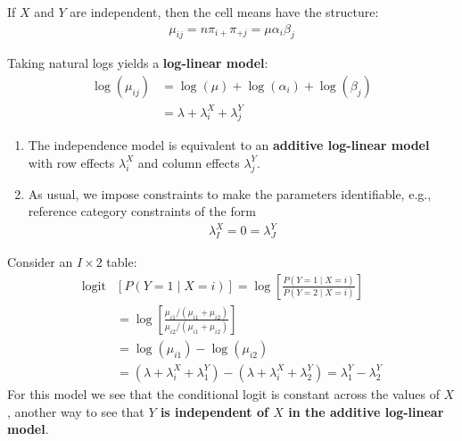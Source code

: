 \documentclass[11pt]{elegantbook}
\begin{document}
If $X$ and $Y$ are \textnormal{independent}, then the cell means have the structure:
\begin{equation}
    \begin{aligned}
        \mu_{ij}=n\pi_{i+}\pi_{+j}=\mu\alpha_i\beta_j
    \end{aligned}
    \nonumber
\end{equation}
\begin{definition}
    Taking natural logs yields a \textbf{log-linear model}:
    \begin{equation}
        \begin{aligned}
            \log(\mu_{ij})&=\log(\mu)+\log(\alpha_i)+\log(\beta_j)\\
            &=\lambda+\lambda_i^X+\lambda_j^Y
        \end{aligned}
        \nonumber
    \end{equation}
    \begin{enumerate}[$\bullet$]
        \item The independence model is equivalent to an \textbf{additive log-linear model} with row effects $\lambda_i^X$ and column effects $\lambda_j^Y$.
        \item As usual, we impose constraints to make the parameters identifiable, e.g., reference category constraints of the form
        \begin{equation}
            \begin{aligned}
                \lambda_I^X=0=\lambda_J^Y
            \end{aligned}
            \nonumber
        \end{equation}
    \end{enumerate}
\end{definition}
Consider an $I \times 2$ table:
$$
\begin{aligned}
\operatorname{logit} & {[P(Y=1 \mid X=i)]=\log \left[\frac{P(Y=1 \mid X=i)}{P(Y=2 \mid X=i)}\right] } \\
& =\log \left[\frac{\mu_{i 1} /\left(\mu_{i 1}+\mu_{i 2}\right)}{\mu_{i 2} /\left(\mu_{i 1}+\mu_{i 2}\right)}\right] \\
& =\log \left(\mu_{i 1}\right)-\log \left(\mu_{i 2}\right) \\
& =\left(\lambda+\lambda_i^X+\lambda_1^Y\right)-\left(\lambda+\lambda_i^X+\lambda_2^Y\right)=\lambda_1^Y-\lambda_2^Y
\end{aligned}
$$
For this model we see that the conditional logit is constant across the values of $X$, another way to see that \textbf{$Y$ is independent of $X$ in the additive log-linear model}.
\end{document}
